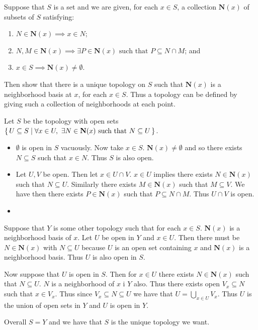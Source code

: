 \documentclass[letterpaper, 11pt, oneside]{book}
\begin{document}
\clearpage

\begin{exercise}
  Suppose that $S$ is a set and we are given, for each $x \in S$, a collection $\textbf{N}(x)$ of subsets of $S$ satisfying:
  \begin{enumerate}
  \item $N \in \textbf{N}(x) \implies x \in N$;
  \item $N, M \in \textbf{N}(x) \implies \exists P \in \textbf{N}(x) \text{ such that } P \subseteq N \cap M$; and
  \item $x \in S \implies \textbf{N}(x) \neq \emptyset$.
  \end{enumerate}
  Then show that there is a unique topology on $S$ such that $\textbf{N}(x)$ is a neighborhood basis at $x$, for each $x \in S$.
  Thus a topology can be defined by giving such a collection of neighborhoods at each point.
\end{exercise}
\begin{pf}
  Let $S$ be the topology with open sets $\set{U \subseteq S | \forall x \in U,~ \exists N \in \textbf{N}(x) \text{ such that } N \subseteq U}$.
  \begin{itemize}
  \item $\emptyset$ is open in $S$ vacuously.
        Now take $x \in S$.
        $\textbf{N}(x) \neq \emptyset$ and so there exists $N \subseteq S$ such that $x \in N$.
        Thus $S$ is also open.
  \item Let $U, V$ be open.
        Then let $x \in U \cap V$.
        $x \in U$ implies there exists $N \in \textbf{N}(x)$ such that $N \subseteq U$.
        Similarly there exists $M \in \textbf{N}(x)$ such that $M \subseteq V$.
        We have then there exists $P \in \textbf{N}(x)$ such that $P \subseteq N \cap M$.
        Thus $U \cap V$ is open.
  \item {}
  \end{itemize}

  Suppose that $Y$ is some other topology such that for each $x \in S$. $\textbf{N}(x)$ is a neighborhood basis of $x$.
  Let $U$ be open in $Y$ and $x \in U$.
  Then there must be $N \in \textbf{N}(x)$ with $N \subseteq U$ because $U$ is an open set containing $x$ and $\textbf{N}(x)$ is a neighborhood basis.
  Thus $U$ is also open in $S$.

  Now suppose that $U$ is open in $S$.
  Then for $x \in  U$ there exists $N \in \textbf{N}(x)$ such that $N \subseteq U$.
  $N$ is a neighborhood of $x$ i $Y$ also.
  Thus there exists open $V_{x} \subseteq N$ such that $x \in V_{x}$.
  Thus since $V_{x} \subseteq N \subseteq U$ we have that $U = \bigcup_{x \in U} V_{x}$.
  Thus $U$ is the union of open sets in $Y$ and $U$ is open in $Y$.

  Overall $S = Y$ and we have that $S$ is the unique topology we want.
\end{pf}
\end{document}
